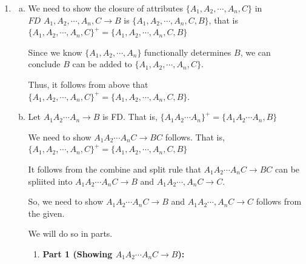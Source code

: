 \documentclass[12pt]{article}
\begin{document}
\begin{enumerate}[1.]
\begin{enumerate}[i)]
\begin{enumerate}[a)]
        \end{enumerate}

    \end{enumerate}

    \item

        \begin{enumerate}[a)]
            \item

            We need to show the closure of attributes $\{A_1,A_2,\cdots,A_n,C\}$ in
            \\ $FD$ $A_1,A_2,\cdots,A_n,C \to B$ is $\{A_1,A_2,\cdots,A_n,C,B\}$, that is
            $\{A_1,A_2,\cdots,A_n,C\}^+ = \{A_1,A_2,\cdots,A_n,C,B\}$

            \bigskip

            Since we know $\{A_1,A_2,\cdots,A_n\}$ functionally determines $B$,
            we can conclude $B$ can be added to $\{A_1,A_2,\cdots,A_n,C\}$.

            \bigskip

            Thus, it follows from above that $\{A_1,A_2,\cdots,A_n,C\}^+ = \{A_1,A_2,\cdots,A_n,C,B\}$.

            \item

            Let $A_1A_2\cdots A_n \to B$ is FD. That is, $\{A_1A_2\cdots A_n\}^+ = \{A_1A_2\cdots A_n, B\}$

            \bigskip

            We need to show $A_1A_2 \cdots A_nC \to BC$ follows. That is,
            $\{A_1,A_2,\cdots,A_n,C\}^+ = \{A_1,A_2,\cdots,A_n,C,B\}$

            \bigskip

            It follows from the combine and split rule that $A_1A_2\cdots A_n C \to BC$
            can be spliited into $A_1A_2\cdots A_nC \to B$ and $A_1A_2\cdots,A_nC \to C$.

            \bigskip

            So, we need to show $A_1A_2\cdots A_nC \to B$ and $A_1A_2\cdots,A_nC \to C$ follows
            from the given.

            \bigskip

            We will do so in parts.

            \bigskip

            \begin{enumerate}[1.]
                \item \textbf{Part 1 (Showing $A_1A_2\cdots A_nC \to B$):}


\end{enumerate}
\end{enumerate}
\end{enumerate}
\end{document}
